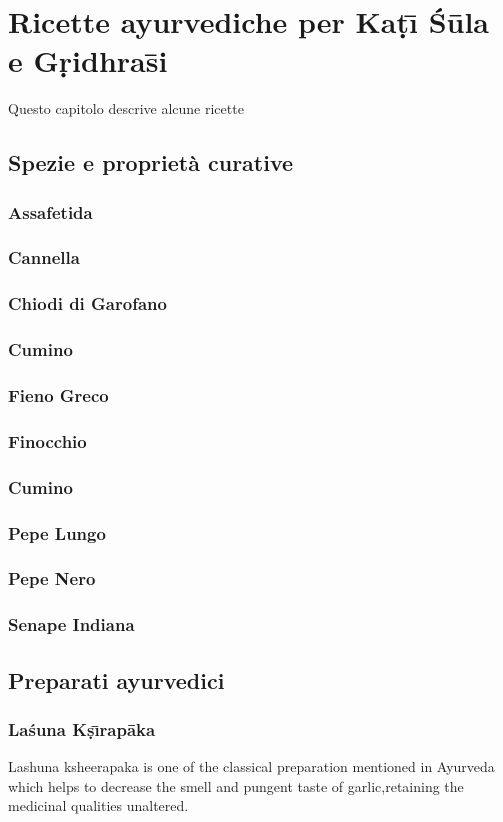 
\chapter{Ricette ayurvediche per Ka\d{t}\={\i} \'{S}\={u}la e G\d{r}idhra\={s}i}

Questo capitolo descrive alcune ricette

\section{Spezie e proprietà curative} 


\subsection{Assafetida} 


\subsection{Cannella} 


\subsection{Chiodi di Garofano} 


\subsection{Cumino} 

\subsection{Fieno Greco} 

\subsection{Finocchio} 

\subsection{Cumino} 

\subsection{Pepe Lungo} 

\subsection{Pepe Nero}

\subsection{Senape Indiana}


\section{Preparati ayurvedici} 

\subsection{La\'{s}una K\d{s}\={\i}rap\={a}ka} 

Lashuna ksheerapaka is one of the classical preparation mentioned in Ayurveda which helps to decrease the smell and pungent taste of garlic,retaining the medicinal qualities unaltered.
